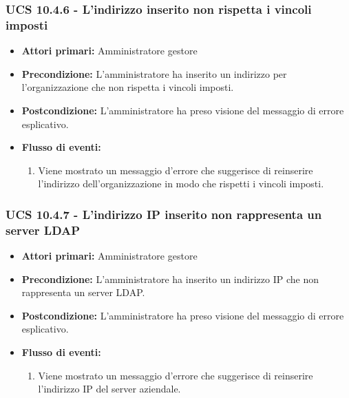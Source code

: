 \subsubsection{UCS 10.4.6 - L'indirizzo inserito non rispetta i vincoli imposti}%
\begin{itemize}
\item \textbf{Attori primari:} Amministratore gestore
\item \textbf{Precondizione:} L'amministratore ha inserito un indirizzo per l'organizzazione che non rispetta i vincoli imposti.
\item \textbf{Postcondizione:} L'amministratore ha preso visione del messaggio di errore esplicativo.
\item \textbf{Flusso di eventi:}
    \begin{enumerate}
    \item Viene mostrato un messaggio d'errore che suggerisce di reinserire l'indirizzo dell'organizzazione in modo che rispetti i vincoli imposti.
    \end{enumerate} 
\end{itemize}

\subsubsection{UCS 10.4.7 - L'indirizzo IP inserito non rappresenta un server LDAP}%
\begin{itemize}
\item \textbf{Attori primari:} Amministratore gestore
\item \textbf{Precondizione:} L'amministratore ha inserito un indirizzo IP che non rappresenta un server LDAP.
\item \textbf{Postcondizione:} L'amministratore ha preso visione del messaggio di errore esplicativo.
\item \textbf{Flusso di eventi:}
    \begin{enumerate}
    \item Viene mostrato un messaggio d'errore che suggerisce di reinserire l'indirizzo IP del server aziendale.
    \end{enumerate} 
\end{itemize}


